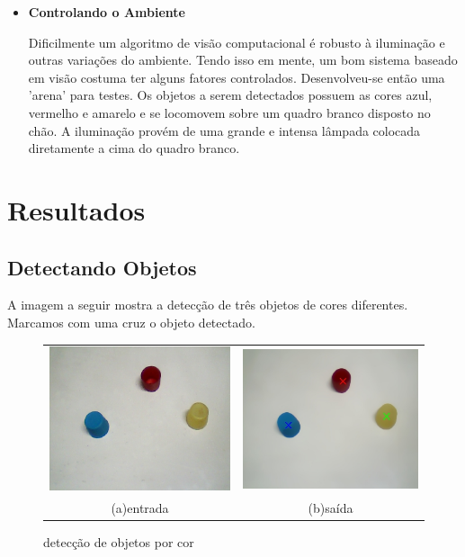 \documentclass[journal]{IEEEtran}
\begin{document}
\begin{itemize}
\item \textbf{Controlando o Ambiente}

Dificilmente um algoritmo de visão computacional é robusto à 
iluminação e outras variações do ambiente. Tendo isso em mente, 
um bom sistema baseado em visão costuma ter alguns fatores 
controlados. Desenvolveu-se então uma 'arena' para testes.
Os objetos a serem detectados possuem as cores azul, vermelho e 
amarelo e se locomovem sobre um quadro branco disposto no chão.
A iluminação provém de uma grande e intensa lâmpada colocada 
diretamente a cima do quadro branco.

\end{itemize}

\section{Resultados}

\subsection{Detectando Objetos}
A imagem a seguir mostra a detecção de três objetos de cores 
diferentes. Marcamos com uma cruz o objeto detectado.
\begin{figure}[!htp]
  \centering
  \begin{tabular}{cc}
	\includegraphics[scale = 0.5]{../images/input.jpg}& 
	\includegraphics[scale = 0.5]{../images/outputCross.jpg} \\
	{\scriptsize(a)entrada} & {\scriptsize(b)saída} \\
  \end{tabular}  
  \caption{detecção de objetos por cor}
  \label{fig:detecSimples}
  \end{figure}
  
\end{document}
